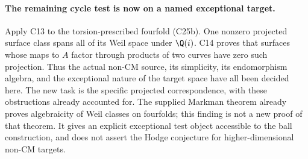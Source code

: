 \paragraph{The remaining cycle test is now on a named exceptional target.}
Apply C13 to the torsion-prescribed fourfold (C25b).
One nonzero projected surface class spans all of its
Weil space under $\Q(i)$. C14 proves that surfaces
whose maps to $A$ factor through products of two
curves have zero such projection. Thus the actual
non-CM source, its simplicity, its endomorphism
algebra, and the exceptional nature of the target
space have all been decided here. The new task is
the specific projected correspondence, with these
obstructions already accounted for. The supplied
Markman theorem already proves algebraicity of
Weil classes on fourfolds; this finding is not a
new proof of that theorem. It gives an explicit
exceptional test object accessible to the ball
construction, and does not assert the Hodge
conjecture for higher-dimensional non-CM targets.

